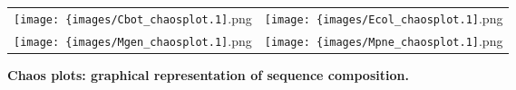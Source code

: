 % 
%
\begin{figure}[!h]

 \begin{center}
 
  \begin{tabular}{cc}
   \texttt{[image: \{images/Cbot\_chaosplot.1]}.png} &
   \texttt{[image: \{images/Ecol\_chaosplot.1]}.png}    \\
   \texttt{[image: \{images/Mgen\_chaosplot.1]}.png} &
   \texttt{[image: \{images/Mpne\_chaosplot.1]}.png}    \\
  \end{tabular}
  \parbox{0.7\textwidth}{%
   \caption[Chaos plots: graphical representation of sequence composition.]{%
   \label{fig:Chaos_plots}\textbf{Chaos plots: graphical representation of sequence composition.}
   }%
  }%

 \end{center}
 
\end{figure}
